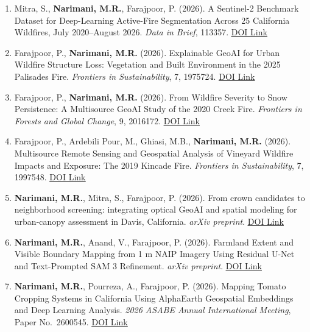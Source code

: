 \documentclass[11pt,a4paper]{article}
\begin{document}
\begin{enumerate}
\item Mitra, S., \textbf{Narimani, M.R.}, Farajpoor, P. (2026). A Sentinel-2 Benchmark Dataset for Deep-Learning Active-Fire Segmentation Across 25 California Wildfires, July 2020--August 2026. \textit{Data in Brief}, 113357. \href{https://doi.org/10.1016/j.dib.2026.113357}{\underline{DOI Link}}

\item Farajpoor, P., \textbf{Narimani, M.R.} (2026). Explainable GeoAI for Urban Wildfire Structure Loss: Vegetation and Built Environment in the 2025 Palisades Fire. \textit{Frontiers in Sustainability}, 7, 1975724. \href{https://www.frontiersin.org/journals/sustainability/articles/10.3389/frsus.2026.1975724/full}{\underline{DOI Link}}

\item Farajpoor, P., \textbf{Narimani, M.R.} (2026). From Wildfire Severity to Snow Persistence: A Multisource GeoAI Study of the 2020 Creek Fire. \textit{Frontiers in Forests and Global Change}, 9, 2016172. \href{https://doi.org/10.3389/ffgc.2026.2016172}{\underline{DOI Link}}

\item Farajpoor, P., Ardebili Pour, M., Ghiasi, M.B., \textbf{Narimani, M.R.} (2026). Multisource Remote Sensing and Geospatial Analysis of Vineyard Wildfire Impacts and Exposure: The 2019 Kincade Fire. \textit{Frontiers in Sustainability}, 7, 1997548. \href{https://doi.org/10.3389/frsus.2026.1997548}{\underline{DOI Link}}

\item \textbf{Narimani, M.R.}, Mitra, S., Farajpoor, P. (2026). From crown candidates to neighborhood screening: integrating optical GeoAI and spatial modeling for urban-canopy assessment in Davis, California. \textit{arXiv preprint}. \href{https://arxiv.org/abs/2608.13856}{\underline{DOI Link}}

\item \textbf{Narimani, M.R.}, Anand, V., Farajpoor, P. (2026). Farmland Extent and Visible Boundary Mapping from 1 m NAIP Imagery Using Residual U-Net and Text-Prompted SAM 3 Refinement. \textit{arXiv preprint}. \href{https://arxiv.org/abs/2607.21881}{\underline{DOI Link}}

\item \textbf{Narimani, M.R.}, Pourreza, A., Farajpoor, P. (2026). Mapping Tomato Cropping Systems in California Using AlphaEarth Geospatial Embeddings and Deep Learning Analysis. \textit{2026 ASABE Annual International Meeting}, Paper No.\ 2600545. \href{https://arxiv.org/abs/2605.21804}{\underline{DOI Link}}


\end{enumerate}
\end{document}
